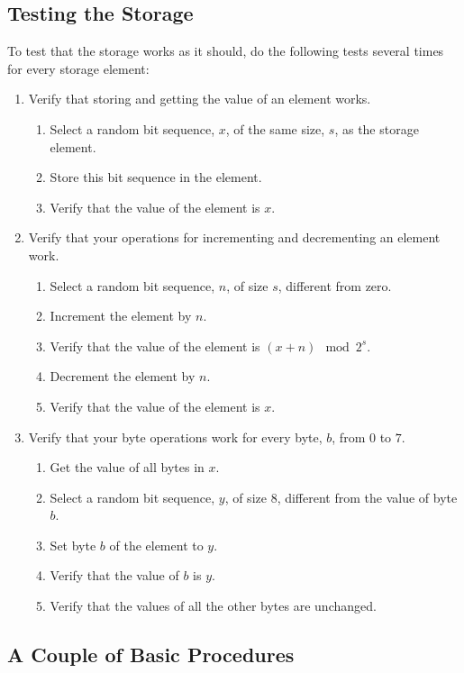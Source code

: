 \documentclass[a4paper,12pt]{article}
\begin{document}
\subsection{Testing the Storage}

To test that the storage works as it should, do the following tests several times for every storage element:
\begin{enumerate}
\item Verify that storing and getting the value of an element works.
  \begin{enumerate}
  \item Select a random bit sequence, $x$, of the same size, $s$, as the storage element.
  \item Store this bit sequence in the element.
  \item Verify that the value of the element is $x$.
  \end{enumerate}
\item Verify that your operations for incrementing and decrementing an element work.
  \begin{enumerate}
  \item Select a random bit sequence, $n$, of size $s$, different from zero.
  \item Increment the element by $n$.
  \item Verify that the value of the element is $(x + n) \mod 2^s$.
  \item Decrement the element by $n$.
  \item Verify that the value of the element is $x$.
  \end{enumerate}
\item Verify that your byte operations work for every byte, $b$, from $0$ to $7$.
  \begin{enumerate}
  \item Get the value of all bytes in $x$.
  \item Select a random bit sequence, $y$, of size $8$, different from the value of byte $b$.
  \item Set byte $b$ of the element to $y$.
  \item Verify that the value of $b$ is $y$.
  \item Verify that the values of all the other bytes are unchanged.
  \end{enumerate}
\end{enumerate}

\subsection{A Couple of Basic Procedures}
\end{document}
